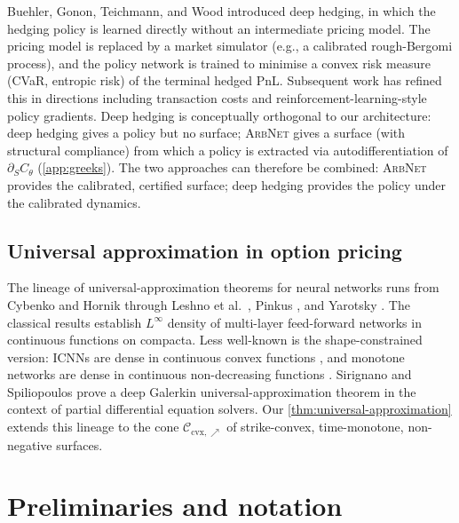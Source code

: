 \documentclass[largeformat]{interact}
\let\cite\citep   %
\theoremstyle{plain}
\theoremstyle{definition}
\newcommand{\arbnet}{\textsc{ArbNet}}
\begin{document}
Buehler, Gonon, Teichmann, and Wood \cite{buehler2019deep} introduced deep hedging, in which the hedging policy is learned directly without an intermediate pricing model. The pricing model is replaced by a market simulator (e.g., a calibrated rough-Bergomi process), and the policy network is trained to minimise a convex risk measure (CVaR, entropic risk) of the terminal hedged PnL. Subsequent work \cite{chakrabarti2019deep,imaki2021no,vallarino2024} has refined this in directions including transaction costs and reinforcement-learning-style policy gradients. Deep hedging is conceptually orthogonal to our architecture: deep hedging gives a policy but no surface; \arbnet{} gives a surface (with structural compliance) from which a policy is extracted via autodifferentiation of $\partial_S C_\theta$ (\cref{app:greeks}). The two approaches can therefore be combined: \arbnet{} provides the calibrated, certified surface; deep hedging provides the policy under the calibrated dynamics.

\subsection{Universal approximation in option pricing}
\label{sec:related-universal-approx}

The lineage of universal-approximation theorems for neural networks runs from Cybenko \citeyearpar{cybenko1989approximation} and Hornik \citeyearpar{hornik1989multilayer,hornik1991approximation} through Leshno et al.\ \citeyearpar{leshno1993multilayer}, Pinkus \citeyearpar{pinkus1999approximation}, and Yarotsky \citeyearpar{yarotsky2017error}. The classical results establish $L^\infty$ density of multi-layer feed-forward networks in continuous functions on compacta. Less well-known is the shape-constrained version: ICNNs are dense in continuous convex functions \cite{amos2017input,chen2018optimal,bunne2022supervised}, and monotone networks are dense in continuous non-decreasing functions \cite{daniels2010monotone,wehenkel2019unconstrained,runje2023constrained,guo2021neural}. Sirignano and Spiliopoulos \citeyearpar{sirignano2018universal} prove a deep Galerkin universal-approximation theorem in the context of partial differential equation solvers. Our \cref{thm:universal-approximation} extends this lineage to the cone $\mathcal{C}_{\mathrm{cvx},\nearrow}$ of strike-convex, time-monotone, non-negative surfaces.

\section{Preliminaries and notation}
\label{sec:preliminaries}
\end{document}
